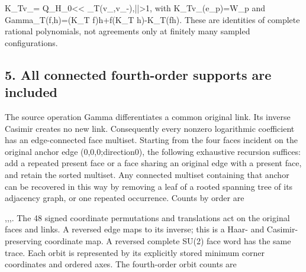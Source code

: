 \documentclass[11pt,a4paper]{article}
\renewcommand{\[}{\begingroup\small\originaldisplaystart}
\renewcommand{\]}{\originaldisplayend\endgroup}
\begin{document}
\[
 K_Tv_\nu=
 Q_H\!\sum_{0<\mu<\nu}
 \Gamma_T(v_\mu,v_{\nu-\mu}),\qquad |\nu|>1,
\] with
{\ttfamily K\allowbreak{}\_\allowbreak{}T\allowbreak{}v\allowbreak{}\_\allowbreak{}(\allowbreak{}e\allowbreak{}\_\allowbreak{}p\allowbreak{})\allowbreak{}=\allowbreak{}W\allowbreak{}\_\allowbreak{}p\allowbreak{}}
and
{\allowbreak{} \allowbreak{}G\allowbreak{}a\allowbreak{}m\allowbreak{}m\allowbreak{}a\allowbreak{}\_\allowbreak{}T\allowbreak{}(\allowbreak{}f\allowbreak{},\allowbreak{}h\allowbreak{})\allowbreak{}=\allowbreak{}(\allowbreak{}K\allowbreak{}\_\allowbreak{}T\allowbreak{} \allowbreak{}f\allowbreak{})\allowbreak{}h\allowbreak{}+\allowbreak{}f\allowbreak{}(\allowbreak{}K\allowbreak{}\_\allowbreak{}T\allowbreak{} \allowbreak{}h\allowbreak{})\allowbreak{}-\allowbreak{}K\allowbreak{}\_\allowbreak{}T\allowbreak{}(\allowbreak{}f\allowbreak{}h\allowbreak{})\allowbreak{}}.
These are identities of complete rational polynomials, not agreements
only at finitely many sampled configurations.

\subsection{5. All connected fourth-order supports are
included}\label{all-connected-fourth-order-supports-are-included}

The source operation Gamma differentiates a common original link. Its
inverse Casimir creates no new link. Consequently every nonzero
logarithmic coefficient has an edge-connected face multiset. Starting
from the four faces incident on the original anchor edge
{\ttfamily (\allowbreak{}0\allowbreak{},\allowbreak{}0\allowbreak{},\allowbreak{}0\allowbreak{};\allowbreak{}d\allowbreak{}i\allowbreak{}r\allowbreak{}e\allowbreak{}c\allowbreak{}t\allowbreak{}i\allowbreak{}o\allowbreak{}n\allowbreak{}0\allowbreak{})\allowbreak{}},
the following exhaustive recursion suffices: add a repeated present face
or a face sharing an original edge with a present face, and retain the
sorted multiset. Any connected multiset containing that anchor can be
recovered in this way by removing a leaf of a rooted spanning tree of
its adjacency graph, or one repeated occurrence. Counts by order are

\[
 4,,,.
\] The 48 signed coordinate permutations and translations act on the
original faces and links. A reversed edge maps to its inverse; this is a
Haar- and Casimir-preserving coordinate map. A reversed complete SU(2)
face word has the same trace. Each orbit is represented by its
explicitly stored minimum corner coordinates and ordered axes. The
fourth-order orbit counts are
\end{document}
